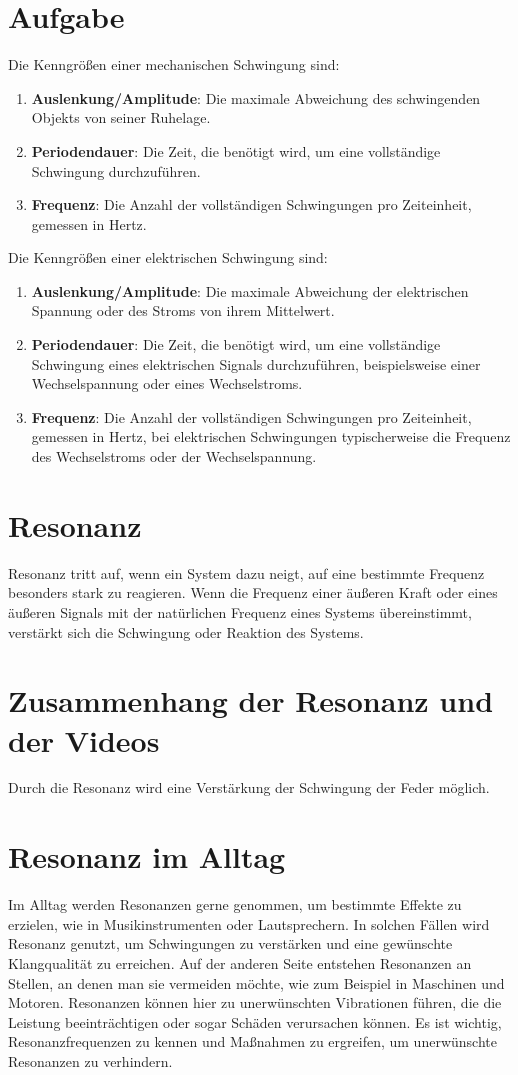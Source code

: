 \documentclass[12pt,a4paper]{report}
\begin{document}
	\section{Aufgabe}
	Die Kenngrößen einer mechanischen Schwingung sind:
	\begin{enumerate}
		\item \textbf{Auslenkung/Amplitude}: Die maximale Abweichung des schwingenden Objekts von seiner Ruhelage.
		\item \textbf{Periodendauer}: Die Zeit, die benötigt wird, um eine vollständige Schwingung durchzuführen.
		\item \textbf{Frequenz}: Die Anzahl der vollständigen Schwingungen pro Zeiteinheit, gemessen in Hertz.
	\end{enumerate}
	Die Kenngrößen einer elektrischen Schwingung sind:
	\begin{enumerate}
		\item \textbf{Auslenkung/Amplitude}: Die maximale Abweichung der elektrischen Spannung oder des Stroms von ihrem Mittelwert.
		\item \textbf{Periodendauer}: Die Zeit, die benötigt wird, um eine vollständige Schwingung eines elektrischen Signals durchzuführen, beispielsweise einer Wechselspannung oder eines Wechselstroms.
		\item \textbf{Frequenz}: Die Anzahl der vollständigen Schwingungen pro Zeiteinheit, gemessen in Hertz, bei elektrischen Schwingungen typischerweise die Frequenz des Wechselstroms oder der Wechselspannung.
	\end{enumerate}
	\thispagestyle{empty}
	\section{Resonanz}
	Resonanz tritt auf, wenn ein System dazu neigt, auf eine bestimmte Frequenz besonders stark zu reagieren.
	Wenn die Frequenz einer äußeren Kraft oder eines äußeren Signals mit der natürlichen Frequenz eines Systems übereinstimmt, verstärkt sich die Schwingung oder Reaktion des Systems.
	\section{Zusammenhang der Resonanz und der Videos}
	Durch die Resonanz wird eine Verstärkung der Schwingung der Feder möglich.
	\section{Resonanz im Alltag}
	Im Alltag werden Resonanzen gerne genommen, um bestimmte Effekte zu erzielen, wie in Musikinstrumenten oder Lautsprechern.
	In solchen Fällen wird Resonanz genutzt, um Schwingungen zu verstärken und eine gewünschte Klangqualität zu erreichen. 
	Auf der anderen Seite entstehen Resonanzen an Stellen, an denen man sie vermeiden möchte, wie zum Beispiel in Maschinen und Motoren.
	Resonanzen können hier zu unerwünschten Vibrationen führen, die die Leistung beeinträchtigen oder sogar Schäden verursachen können.
	Es ist wichtig, Resonanzfrequenzen zu kennen und Maßnahmen zu ergreifen, um unerwünschte Resonanzen zu verhindern.
	\thispagestyle{empty}
\end{document}
